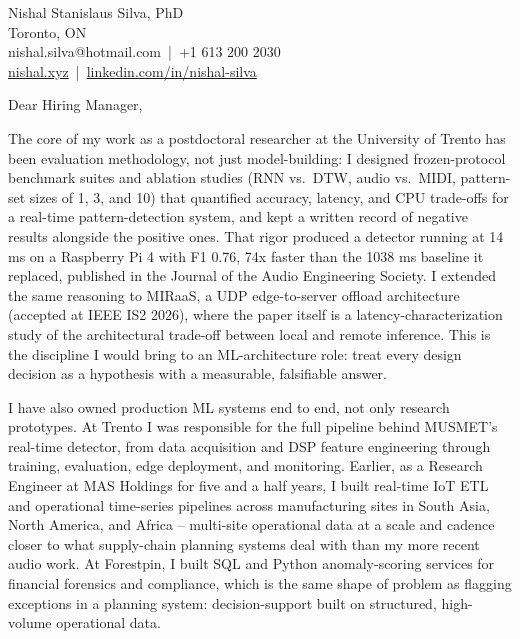 \documentclass[11pt]{article}
\begin{document}
\pagestyle{empty}

\begin{flushleft}
Nishal Stanislaus Silva, PhD\\
Toronto, ON\\
nishal.silva@hotmail.com \,|\, +1 613 200 2030\\
\href{https://nishal.xyz}{nishal.xyz} \,|\, \href{https://www.linkedin.com/in/nishal-silva}{linkedin.com/in/nishal-silva}
\end{flushleft}

\vspace{1em}
Dear Hiring Manager,

\vspace{0.5em}
The core of my work as a postdoctoral researcher at the University of Trento has been evaluation methodology, not just model-building: I designed frozen-protocol benchmark suites and ablation studies (RNN vs.\ DTW, audio vs.\ MIDI, pattern-set sizes of 1, 3, and 10) that quantified accuracy, latency, and CPU trade-offs for a real-time pattern-detection system, and kept a written record of negative results alongside the positive ones. That rigor produced a detector running at 14 ms on a Raspberry Pi 4 with F1 0.76, 74x faster than the 1038 ms baseline it replaced, published in the Journal of the Audio Engineering Society. I extended the same reasoning to MIRaaS, a UDP edge-to-server offload architecture (accepted at IEEE IS2 2026), where the paper itself is a latency-characterization study of the architectural trade-off between local and remote inference. This is the discipline I would bring to an ML-architecture role: treat every design decision as a hypothesis with a measurable, falsifiable answer.

I have also owned production ML systems end to end, not only research prototypes. At Trento I was responsible for the full pipeline behind MUSMET's real-time detector, from data acquisition and DSP feature engineering through training, evaluation, edge deployment, and monitoring. Earlier, as a Research Engineer at MAS Holdings for five and a half years, I built real-time IoT ETL and operational time-series pipelines across manufacturing sites in South Asia, North America, and Africa -- multi-site operational data at a scale and cadence closer to what supply-chain planning systems deal with than my more recent audio work. At Forestpin, I built SQL and Python anomaly-scoring services for financial forensics and compliance, which is the same shape of problem as flagging exceptions in a planning system: decision-support built on structured, high-volume operational data.
\end{document}
